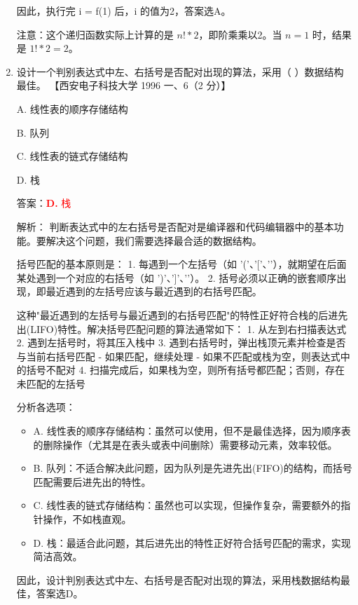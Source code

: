 \documentclass[lang=cn,newtx,10pt,scheme=chinese]{../../../elegantbook}
\begin{document}
\begin{enumerate}
    因此，执行完 i = f(1) 后，i 的值为2，答案选A。

    注意：这个递归函数实际上计算的是 $n! * 2$，即阶乘乘以2。当 $n = 1$ 时，结果是 $1! * 2 = 2$。

    \item 设计一个判别表达式中左、右括号是否配对出现的算法，采用（ ）数据结构最佳。  
    【西安电子科技大学 1996 一、6（2 分）】  

    A. 线性表的顺序存储结构  

    B. 队列  

    C. 线性表的链式存储结构  

    D. 栈  

    答案：\textcolor{red}{\textbf{D.} 栈}

    解析：
    判断表达式中的左右括号是否配对是编译器和代码编辑器中的基本功能。要解决这个问题，我们需要选择最合适的数据结构。

    括号匹配的基本原则是：
    1. 每遇到一个左括号（如 '('、'['、'{'），就期望在后面某处遇到一个对应的右括号（如 ')'、']'、'}'）。
    2. 括号必须以正确的嵌套顺序出现，即最近遇到的左括号应该与最近遇到的右括号匹配。

    这种"最近遇到的左括号与最近遇到的右括号匹配"的特性正好符合栈的后进先出(LIFO)特性。解决括号匹配问题的算法通常如下：
    1. 从左到右扫描表达式
    2. 遇到左括号时，将其压入栈中
    3. 遇到右括号时，弹出栈顶元素并检查是否与当前右括号匹配
       - 如果匹配，继续处理
       - 如果不匹配或栈为空，则表达式中的括号不配对
    4. 扫描完成后，如果栈为空，则所有括号都匹配；否则，存在未匹配的左括号

    分析各选项：
    \begin{itemize}
        \item A. 线性表的顺序存储结构：虽然可以使用，但不是最佳选择，因为顺序表的删除操作（尤其是在表头或表中间删除）需要移动元素，效率较低。
        
        \item B. 队列：不适合解决此问题，因为队列是先进先出(FIFO)的结构，而括号匹配需要后进先出的特性。
        
        \item C. 线性表的链式存储结构：虽然也可以实现，但操作复杂，需要额外的指针操作，不如栈直观。
        
        \item D. 栈：最适合此问题，其后进先出的特性正好符合括号匹配的需求，实现简洁高效。
    \end{itemize}

    因此，设计判别表达式中左、右括号是否配对出现的算法，采用栈数据结构最佳，答案选D。


\end{enumerate}
\end{document}
